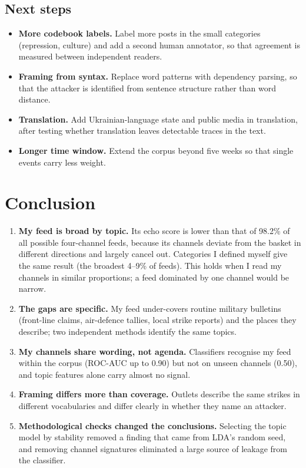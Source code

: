 \documentclass[11pt,a4paper]{article}
\begin{document}
\begin{itemize}
\end{itemize}

\subsection{Next steps}
\begin{itemize}
\item \textbf{More codebook labels.} Label more posts in the small categories (repression, culture) and add a second human annotator, so that agreement is measured between independent readers.
\item \textbf{Framing from syntax.} Replace word patterns with dependency parsing, so that the attacker is identified from sentence structure rather than word distance.
\item \textbf{Translation.} Add Ukrainian-language state and public media in translation, after testing whether translation leaves detectable traces in the text.
\item \textbf{Longer time window.} Extend the corpus beyond five weeks so that single events carry less weight.
\end{itemize}

\section{Conclusion}
\begin{enumerate}
\item \textbf{My feed is broad by topic.} Its echo score is lower than that of 98.2\% of all possible four-channel feeds, because its channels deviate from the basket in different directions and largely cancel out. Categories I defined myself give the same result (the broadest 4--9\% of feeds). This holds when I read my channels in similar proportions; a feed dominated by one channel would be narrow.
\item \textbf{The gaps are specific.} My feed under-covers routine military bulletins (front-line claims, air-defence tallies, local strike reports) and the places they describe; two independent methods identify the same topics.
\item \textbf{My channels share wording, not agenda.} Classifiers recognise my feed within the corpus (ROC-AUC up to 0.90) but not on unseen channels (0.50), and topic features alone carry almost no signal.
\item \textbf{Framing differs more than coverage.} Outlets describe the same strikes in different vocabularies and differ clearly in whether they name an attacker.
\item \textbf{Methodological checks changed the conclusions.} Selecting the topic model by stability removed a finding that came from LDA's random seed, and removing channel signatures eliminated a large source of leakage from the classifier.
\end{enumerate}
\end{document}
